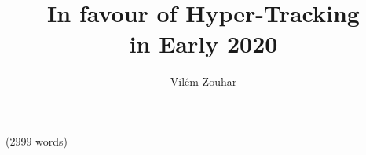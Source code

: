 \documentclass[a4paper, 11pt]{scrartcl}
\title{In favour of Hyper-Tracking\\ in Early 2020}
\author{Vilém Zouhar}
\begin{document}
\maketitle
\begin{center}
	\small (2999 words)
\end{center}


\tableofcontents

\clearpage


\end{document}

